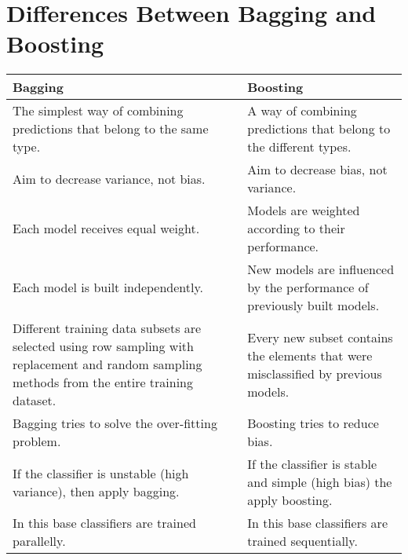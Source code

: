 \section{Differences Between Bagging and Boosting}
    \begin{center}
        \begin{tabularx}{0.8\textwidth} { 
            | >{\raggedright\arraybackslash}X 
            | >{\raggedright\arraybackslash}X 
            | } 
            \hline
            Bagging & Boosting \\ 
            \hline
            The simplest way of combining predictions that belong to the same type.	& A way of combining predictions that belong to the different types.\\
            \hline
            Aim to decrease variance, not bias.	& Aim to decrease bias, not variance. \\
            \hline
            Each model receives equal weight.	& Models are weighted according to their performance. \\
            \hline
            Each model is built independently.	& New models are influenced by the performance of previously built models.\\
            \hline
            Different training data subsets are selected using row sampling with replacement and random sampling methods from the entire training dataset. & Every new subset contains the elements that were misclassified by previous models.\\
            \hline
            Bagging tries to solve the over-fitting problem. & Boosting tries to reduce bias.\\
            \hline
            If the classifier is unstable (high variance), then apply bagging. & If the classifier is stable and simple (high bias) the apply boosting.\\
            \hline
            In this base classifiers are trained parallelly. & In this base classifiers are trained sequentially.\\
            \hline
        \end{tabularx}
    \end{center}